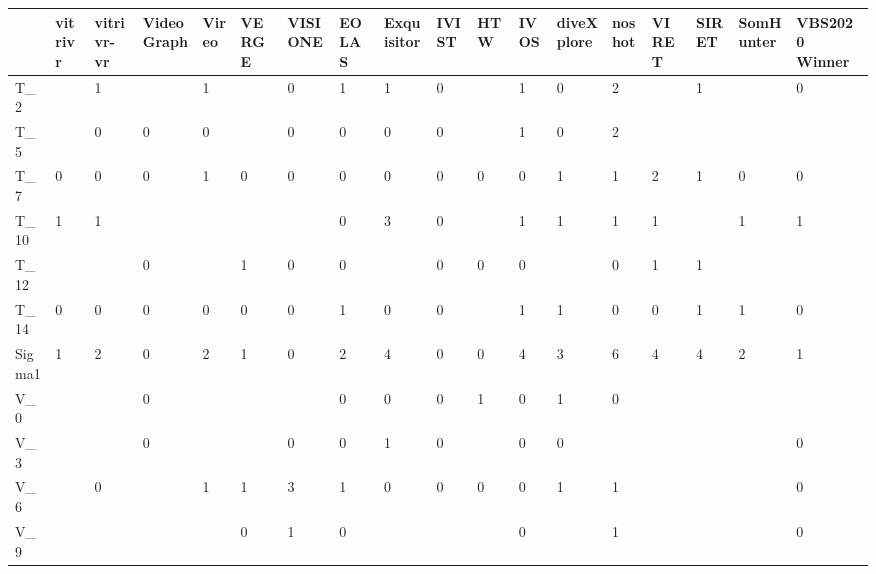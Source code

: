 \begin{tabular}{llllllllllllllllll}
\toprule
{} & vitrivr & vitrivr-vr & VideoGraph & Vireo & VERGE & VISIONE & EOLAS & Exquisitor & IVIST &  HTW & IVOS & diveXplore & noshot & VIRET & SIRET & SomHunter & VBS2020 Winner \\
\midrule
T\_2    &         &          1 &            &     1 &       &       0 &     1 &          1 &     0 &      &    1 &          0 &      2 &       &     1 &           &              0 \\
T\_5    &         &          0 &          0 &     0 &       &       0 &     0 &          0 &     0 &      &    1 &          0 &      2 &       &       &           &                \\
T\_7    &       0 &          0 &          0 &     1 &     0 &       0 &     0 &          0 &     0 &    0 &    0 &          1 &      1 &     2 &     1 &         0 &              0 \\
T\_10   &       1 &          1 &            &       &       &         &     0 &          3 &     0 &      &    1 &          1 &      1 &     1 &       &         1 &              1 \\
T\_12   &         &            &          0 &       &     1 &       0 &     0 &            &     0 &    0 &    0 &            &      0 &     1 &     1 &           &                \\
T\_14   &       0 &          0 &          0 &     0 &     0 &       0 &     1 &          0 &     0 &      &    1 &          1 &      0 &     0 &     1 &         1 &              0 \\
Sigma1 &       1 &          2 &          0 &     2 &     1 &       0 &     2 &          4 &     0 &    0 &    4 &          3 &      6 &     4 &     4 &         2 &              1 \\
V\_0    &         &            &          0 &       &       &         &     0 &          0 &     0 &    1 &    0 &          1 &      0 &       &       &           &                \\
V\_3    &         &            &          0 &       &       &       0 &     0 &          1 &     0 &      &    0 &          0 &        &       &       &           &              0 \\
V\_6    &         &          0 &            &     1 &     1 &       3 &     1 &          0 &     0 &    0 &    0 &          1 &      1 &       &       &           &              0 \\
V\_9    &         &            &            &       &     0 &       1 &     0 &            &       &      &    0 &            &      1 &       &       &           &              0 \\

\end{tabular}
